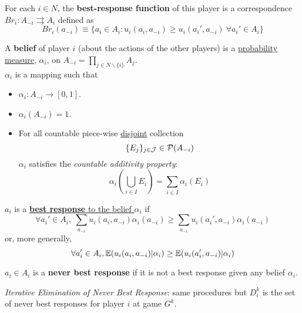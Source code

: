 \documentclass[11pt]{article}
\begin{document}
			\begin{definition}
				For each $i \in N$, the \textbf{best-response function} of this player is a correspondence $Br_i: A_{-i} \rightrightarrows A_i$ defined as
				\begin{equation}
					Br_i(a_{-i}) \equiv \{a_i \in A_i : u_i(a_i, a_{-i}) \geq u_i(a_i', a_{-i})\ \forall a_i' \in A_i \}
				\end{equation}
			\end{definition}
			
			\begin{definition}
				A \textbf{belief} of player $i$ (about the actions of the other players) is a \ul{probability measure}, $\alpha_i$, on $A_{-i}=\prod_{j \in N \backslash \{i\}} A_j$. \\
				$\alpha_i$ is a mapping such that
				\begin{itemize}
					\item $\alpha_i: A_{-i} \to [0,1]$.
					\item $\alpha_i(A_{-i}) = 1$.
					\item For all countable piece-wise \ul{disjoint} collection 
					\[
						\{E_j\}_{j\in \mathcal{{J}}} \in \mathcal{{P}}(A_{-i})
					\]
					$\alpha_i$ satisfies the \emph{countable additivity property}:
					\[
						\alpha_i(\bigcup_{i \in I} E_i) = \sum_{i \in I}\alpha_i(E_i)
					\]
				\end{itemize}
			\end{definition}
				
			\begin{definition}
				$a_i$ is a \ul{\textbf{best response} to the belief $\alpha_i$} if
				\begin{equation}
					\forall a_i' \in A_i,\ \sum_{a_{-i}} u_i(a_i, a_{-i}) \alpha_i(a_{-i}) \geq \sum_{a_{-i}} u_i(a_i', a_{-i}) \alpha_i(a_{-i})
				\end{equation}
				or, more generally,
				\begin{equation}
					\forall a'_i \in A_i, \mathbb{E}({u_i(a_i, a_{-i})|\alpha_i}) \geq \mathbb{E}({u_i(a_i', a_{-i})|\alpha_i})
				\end{equation}
			\end{definition}
			
			\begin{definition}
				$a_i \in A_i$ is a \textbf{never best response} if it is not a best response given any belief $\alpha_i$.
			\end{definition}
			
			\begin{corollary}
				\emph{Iterative Elimination of Never Best Response}: same procedures but $D_i^k$ is the set of never best responses for player $i$ at game $G^k$.
			\end{corollary}
			
\end{document}
